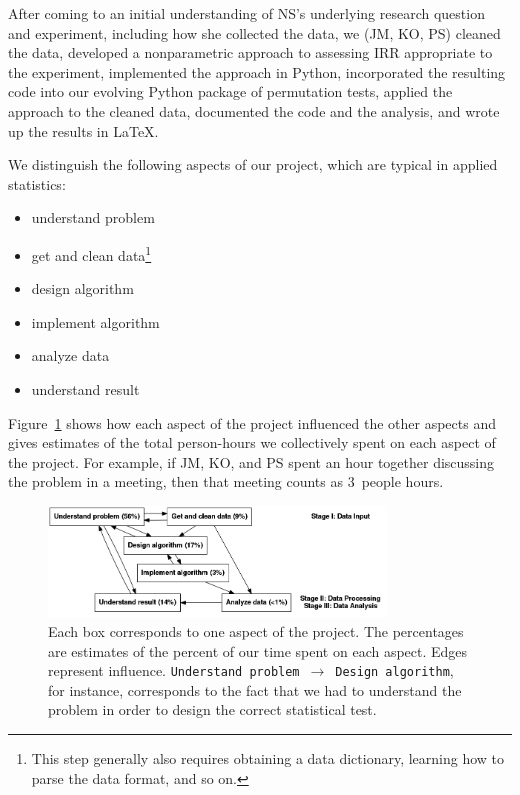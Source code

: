 \documentclass[]{article}
\begin{document}
After coming to an initial understanding of NS's underlying research question
and experiment, including how she collected the data, we (JM, KO, PS) 
cleaned the data, developed a nonparametric approach to assessing IRR
appropriate to the experiment, implemented the approach in Python, incorporated
the resulting code into our evolving Python package of permutation tests,
applied the approach to the cleaned data, documented the code and the analysis,
and wrote up the results in \LaTeX. 

We distinguish the following aspects of our project, which are typical in
applied statistics:
\begin{itemize}
    \item understand problem
    \item get and clean data\footnote{
        This step generally also requires obtaining a data dictionary, learning
        how to parse the data format, and so on.
        }
    \item design algorithm
    \item implement algorithm
    \item analyze data
    \item understand result
\end{itemize}
Figure~\ref{fig:work_process} shows how each aspect of the
project influenced the other aspects and gives estimates of the total person-hours
we collectively spent on each aspect of the project.
For example, if JM, KO, and PS spent an hour together discussing the
problem in a meeting, then that meeting counts as 3~people hours.

\begin{figure}[h]
  \centering
    \includegraphics[width=0.8\textwidth]{_fig/work_process_bids.png}
  \caption{
  \small
    Each box corresponds to one aspect of the project.
    The percentages are estimates of the percent of our time spent on each aspect.
    Edges represent influence.
    \texttt{Understand problem}~$\to$~\texttt{Design algorithm}, for instance,
    corresponds to the fact that we had to understand the problem in order to
    design the correct statistical test.\label{fig:work_process}}
\end{figure}
\end{document}

